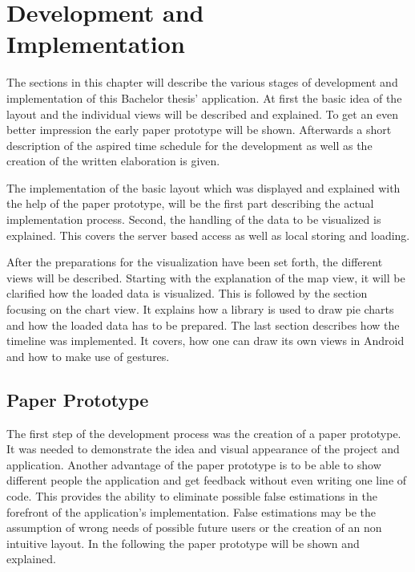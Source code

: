 \chapter{Development and\\Implementation}
\label{cha:implementation}
The sections in this chapter will describe the various stages of development and implementation of this Bachelor thesis' application. At first the basic idea of the layout and the individual views will be described and explained. To get an even better impression the early paper prototype will be shown. Afterwards a short description of the aspired time schedule for the development as well as the creation of the written elaboration is given.

The implementation of the basic layout which was displayed and explained with the help of the paper prototype, will be the first part describing the actual implementation process.
Second, the handling of the data to be visualized is explained. This covers the server based access as well as local storing and loading. 

After the preparations for the visualization have been set forth, the different views will be described. Starting with the explanation of the map view, it will be clarified how the loaded data is visualized. This is followed by the section focusing on the chart view. It explains how a library is used to draw pie charts and how the loaded data has to be prepared. The last section describes how the timeline was implemented. It covers, how one can draw its own views in Android and how to make use of gestures.
\newpage
\section{Paper Prototype}
\label{sec:paper_prototype}
The first step of the development process was the creation of a paper prototype. It was needed to demonstrate the idea and visual appearance of the project and application. Another advantage of the paper prototype is to be able to show different people the application and get feedback without even writing one line of code. This provides the ability to eliminate possible false estimations  in the forefront of the application's implementation. False estimations may be the assumption of wrong needs of possible future users or the creation of an non intuitive layout. In the following the paper prototype will be shown and explained.

